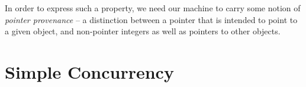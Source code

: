 \documentclass[10pt,conference]{ieeetran}%
\theoremstyle{definition}
\begin{document}
In order to express such a property, we need our machine to carry some notion
of {\it pointer provenance} -- a distinction between a pointer that is intended to
point to a given object, and non-pointer integers as well as pointers to other objects.

\section{Simple Concurrency}



\end{document}
